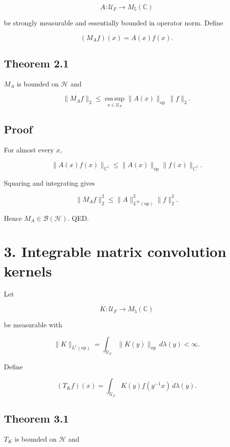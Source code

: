 \[
A:\mathcal U_F\to M_5(\mathbb C)
\]

be strongly measurable and essentially bounded in operator norm. Define

\[
(M_Af)(x)=A(x)f(x).
\]

\hypertarget{theorem-2.1}{%
\subsection{Theorem 2.1}\label{theorem-2.1}}

\(M_A\) is bounded on \(\mathcal H\) and

\[
\|M_Af\|_2
\le
\operatorname*{ess\,sup}_{x\in\mathcal U_F}\|A(x)\|_{\mathrm{op}}
\,\|f\|_2.
\]

\hypertarget{proof}{%
\subsection{Proof}\label{proof}}

For almost every \(x\),

\[
\|A(x)f(x)\|_{\mathbb C^5}
\le
\|A(x)\|_{\mathrm{op}}\|f(x)\|_{\mathbb C^5}.
\]

Squaring and integrating gives

\[
\|M_Af\|_2^2
\le
\|A\|_{L^\infty(\mathrm{op})}^2\|f\|_2^2.
\]

Hence \(M_A\in\mathcal B(\mathcal H)\). QED.

\hypertarget{integrable-matrix-convolution-kernels}{%
\section{3. Integrable matrix convolution kernels}\label{integrable-matrix-convolution-kernels}}

Let

\[
K:\mathcal U_F\to M_5(\mathbb C)
\]

be measurable with

\[
\|K\|_{L^1(\mathrm{op})}
=
\int_{\mathcal U_F}\|K(y)\|_{\mathrm{op}}\,d\lambda(y)
<\infty.
\]

Define

\[
(T_Kf)(x)
=
\int_{\mathcal U_F}K(y)f(y^{-1}x)\,d\lambda(y).
\]

\hypertarget{theorem-3.1}{%
\subsection{Theorem 3.1}\label{theorem-3.1}}

\(T_K\) is bounded on \(\mathcal H\) and

